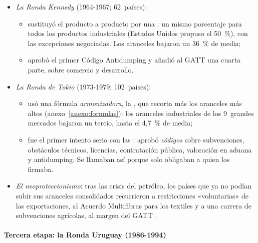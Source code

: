 \documentclass[11pt]{article}
\begin{document}
\begin{itemize}
\item \emph{La Ronda Kennedy} (1964-1967; 62~países):
  \begin{itemize}
  \item sustituyó el producto a producto por una : un mismo porcentaje para todos los productos industriales (Estados Unidos propuso el 50~\%), con las excepciones negociadas. Los aranceles bajaron un 36~\% de media;
  \item aprobó el primer Código Antidumping y añadió al GATT una cuarta parte, sobre comercio y desarrollo.
  \end{itemize}
\item \emph{La Ronda de Tokio} (1973-1979; 102~países):
  \begin{itemize}
  \item usó una fórmula \emph{armonizadora}, la , que recorta más los aranceles más altos (anexo~\ref{anexo:formulas}): los aranceles industriales de los 9~grandes mercados bajaron un tercio, hasta el 4,7~\% de media\nocite{OMC2026AniosGATT};
  \item fue el primer intento serio con las : aprobó \emph{códigos} sobre subvenciones, obstáculos técnicos, licencias, contratación pública, valoración en aduana y antidumping. Se llamaban así porque solo obligaban a quien los firmaba.
  \end{itemize}
\item \emph{El neoproteccionismo}: tras las crisis del petróleo, los países que ya no podían subir sus aranceles consolidados recurrieron a restricciones «voluntarias» de las exportaciones, al Acuerdo Multifibras para los textiles y a una carrera de subvenciones agrícolas, al margen del GATT .
\end{itemize}

\paragraph{Tercera etapa: la Ronda Uruguay (1986-1994)}
\end{document}

